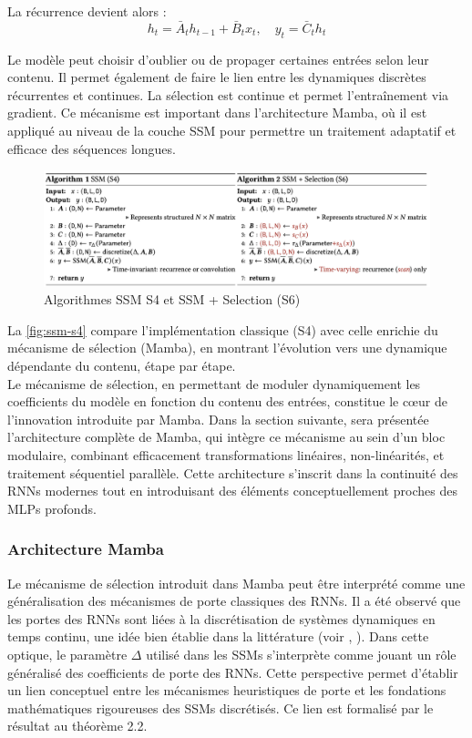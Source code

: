 La récurrence devient alors :
\begin{equation}
    h_t = \bar{A}_t h_{t-1} + \bar{B}_t x_t, \quad y_t = \bar{C}_t h_t
\end{equation}

Le modèle peut choisir d’oublier ou de propager certaines entrées selon leur contenu. Il permet également de faire le lien entre les dynamiques discrètes récurrentes et continues. La sélection est continue et permet l’entraînement via gradient. Ce mécanisme est important dans l’architecture Mamba, où il est appliqué au niveau de la couche SSM pour permettre un traitement adaptatif et efficace des séquences longues.

\begin{figure}[H]
\centering
\includegraphics[scale=0.5]{images/algos_ssm_S4.png}
\caption{Algorithmes SSM S4 et SSM + Selection (S6)}
\label{fig:ssm-s4}
\end{figure}

La \autoref{fig:ssm-s4} compare l’implémentation classique (S4) avec celle enrichie du mécanisme de sélection (Mamba), en montrant l’évolution vers une dynamique dépendante du contenu, étape par étape.\\

Le mécanisme de sélection, en permettant de moduler dynamiquement les coefficients du modèle en fonction du contenu des entrées, constitue le cœur de l’innovation introduite par Mamba. Dans la section suivante, sera présentée l’architecture complète de Mamba, qui intègre ce mécanisme au sein d’un bloc modulaire, combinant efficacement transformations linéaires, non-linéarités, et traitement séquentiel parallèle. Cette architecture s’inscrit dans la continuité des RNNs modernes tout en introduisant des éléments conceptuellement proches des MLPs profonds.

\subsubsection{Architecture Mamba}

Le mécanisme de sélection introduit dans Mamba peut être interprété comme une généralisation des mécanismes de porte classiques des RNNs. Il a été observé que les portes des RNNs sont liées à la discrétisation de systèmes dynamiques en temps continu, une idée bien établie dans la littérature (voir \citep{funahashi1993approximation}, \citep{tallec2018can}). Dans cette optique, le paramètre $\Delta$ utilisé dans les SSMs s’interprète comme jouant un rôle généralisé des coefficients de porte des RNNs. Cette perspective permet d’établir un lien conceptuel entre les mécanismes heuristiques de porte et les fondations mathématiques rigoureuses des SSMs discrétisés. Ce lien est formalisé par le résultat au théorème 2.2.

